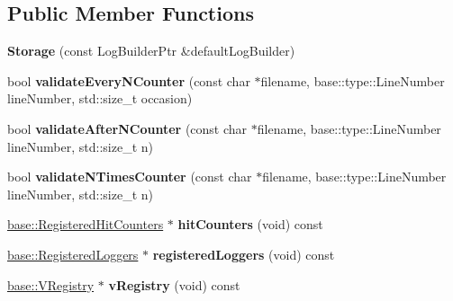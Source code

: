 \subsection*{Public Member Functions}
\begin{DoxyCompactItemize}
\item 
\hypertarget{classel_1_1base_1_1Storage_a4932a8f8a55c3b00467cf2feed6acf59}{{\bfseries Storage} (const Log\-Builder\-Ptr \&default\-Log\-Builder)}\label{classel_1_1base_1_1Storage_a4932a8f8a55c3b00467cf2feed6acf59}

\item 
\hypertarget{classel_1_1base_1_1Storage_a74e5fe30c93b535ee7a1fb20e29bcaf3}{bool {\bfseries validate\-Every\-N\-Counter} (const char $\ast$filename, base\-::type\-::\-Line\-Number line\-Number, std\-::size\-\_\-t occasion)}\label{classel_1_1base_1_1Storage_a74e5fe30c93b535ee7a1fb20e29bcaf3}

\item 
\hypertarget{classel_1_1base_1_1Storage_ad09c13eed65ec6d2248d0693357b1e60}{bool {\bfseries validate\-After\-N\-Counter} (const char $\ast$filename, base\-::type\-::\-Line\-Number line\-Number, std\-::size\-\_\-t n)}\label{classel_1_1base_1_1Storage_ad09c13eed65ec6d2248d0693357b1e60}

\item 
\hypertarget{classel_1_1base_1_1Storage_af6f26975aa70c01ab7f64b2568b2164e}{bool {\bfseries validate\-N\-Times\-Counter} (const char $\ast$filename, base\-::type\-::\-Line\-Number line\-Number, std\-::size\-\_\-t n)}\label{classel_1_1base_1_1Storage_af6f26975aa70c01ab7f64b2568b2164e}

\item 
\hypertarget{classel_1_1base_1_1Storage_accd5495cdad77254eb24ef8f75cd71ad}{\hyperlink{classel_1_1base_1_1RegisteredHitCounters}{base\-::\-Registered\-Hit\-Counters} $\ast$ {\bfseries hit\-Counters} (void) const }\label{classel_1_1base_1_1Storage_accd5495cdad77254eb24ef8f75cd71ad}

\item 
\hypertarget{classel_1_1base_1_1Storage_af0c2f1e119ac3f111f810a324b6b0d3a}{\hyperlink{classel_1_1base_1_1RegisteredLoggers}{base\-::\-Registered\-Loggers} $\ast$ {\bfseries registered\-Loggers} (void) const }\label{classel_1_1base_1_1Storage_af0c2f1e119ac3f111f810a324b6b0d3a}

\item 
\hypertarget{classel_1_1base_1_1Storage_a1ec05ca060ff169569b6ea86da1e30da}{\hyperlink{classel_1_1base_1_1VRegistry}{base\-::\-V\-Registry} $\ast$ {\bfseries v\-Registry} (void) const }\label{classel_1_1base_1_1Storage_a1ec05ca060ff169569b6ea86da1e30da}


\end{DoxyCompactItemize}
